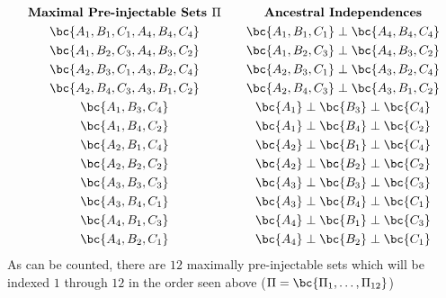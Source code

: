 \documentclass[aps, 10pt, english, twoside, pra, nofootinbib, longbibliography]{revtex4-1}
\theoremstyle{plain}
\theoremstyle{definition}
\theoremstyle{remark}
\newcommand{\ancestralindep}{\perp}
\begin{document}
    \begin{equation}
        \begin{gathered}
            \textbf{Maximal Pre-injectable Sets $\Pi$} \\
            \bc{A_1, B_1, C_1, A_4, B_4, C_4} \\
            \bc{A_1, B_2, C_3, A_4, B_3, C_2} \\
            \bc{A_2, B_3, C_1, A_3, B_2, C_4} \\
            \bc{A_2, B_4, C_3, A_3, B_1, C_2} \\
            \bc{A_1, B_3, C_4} \\
            \bc{A_1, B_4, C_2} \\
            \bc{A_2, B_1, C_4} \\
            \bc{A_2, B_2, C_2} \\
            \bc{A_3, B_3, C_3} \\
            \bc{A_3, B_4, C_1} \\
            \bc{A_4, B_1, C_3} \\
            \bc{A_4, B_2, C_1}
        \end{gathered}
        \qquad
        \begin{gathered}
            \textbf{Ancestral Independences} \\
            \bc{A_1, B_1, C_1} \ancestralindep \bc{A_4, B_4, C_4} \\
            \bc{A_1, B_2, C_3} \ancestralindep \bc{A_4, B_3, C_2} \\
            \bc{A_2, B_3, C_1} \ancestralindep \bc{A_3, B_2, C_4} \\
            \bc{A_2, B_4, C_3} \ancestralindep \bc{A_3, B_1, C_2} \\
            \bc{A_1} \ancestralindep \bc{B_3} \ancestralindep \bc{C_4} \\
            \bc{A_1} \ancestralindep \bc{B_4} \ancestralindep \bc{C_2} \\
            \bc{A_2} \ancestralindep \bc{B_1} \ancestralindep \bc{C_4} \\
            \bc{A_2} \ancestralindep \bc{B_2} \ancestralindep \bc{C_2} \\
            \bc{A_3} \ancestralindep \bc{B_3} \ancestralindep \bc{C_3} \\
            \bc{A_3} \ancestralindep \bc{B_4} \ancestralindep \bc{C_1} \\
            \bc{A_4} \ancestralindep \bc{B_1} \ancestralindep \bc{C_3} \\
            \bc{A_4} \ancestralindep \bc{B_2} \ancestralindep \bc{C_1}
        \end{gathered}
    \end{equation}
    As can be counted, there are $12$ maximally pre-injectable sets which will be indexed $1$ through $12$ in the order seen above ($\Pi = \bc{\Pi_1, \ldots, \Pi_{12}}$)
\end{document}
